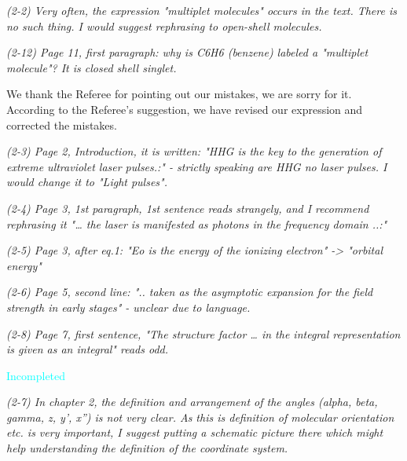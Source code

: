 \documentclass[a4paper,11pt]{article}
\newcommand{\cyan}[1]{\textcolor{cyan}{#1}}
\begin{document}
\vspace{2em}


\textit{
(2-2)
Very often, the expression "multiplet molecules" occurs in the text. There is no such thing. I would suggest rephrasing to open-shell molecules.
}

\textit{
(2-12)
Page 11, first paragraph: why is C6H6 (benzene) labeled a "multiplet molecule"? It is closed shell singlet.
}

\vspace{1em}

We thank the Referee for pointing out our mistakes, we are sorry for it.
According to the Referee's suggestion, we have revised our expression and corrected the mistakes.

\vspace{2em}


\textit{
(2-3)
Page 2, Introduction, it is written: "HHG is the key to the generation of extreme ultraviolet laser pulses.:" - strictly speaking are HHG no laser pulses. I would change it to "Light pulses".
}

\textit{
(2-4)
Page 3, 1st paragraph, 1st sentence reads strangely, and I recommend rephrasing it "… the laser is manifested as photons in the frequency domain ..:"
}

\textit{
(2-5)
Page 3, after eq.1: "Eo is the energy of the ionizing electron" -> "orbital energy"
}

\textit{
(2-6)
Page 5, second line: ".. taken as the asymptotic expansion for the field strength in early stages" - unclear due to language.
}

\textit{
(2-8)
Page 7, first sentence, "The structure factor … in the integral representation is given as an integral" reads odd.
}

\vspace{1em}

\cyan{Incompleted}

\vspace{2em}


\textit{
(2-7)
In chapter 2, the definition and arrangement of the angles (alpha, beta, gamma, z, y', x'') is not very clear. As this is definition of molecular orientation etc. is very important, I suggest putting a schematic picture there which might help understanding the definition of the coordinate system.
}
\end{document}
